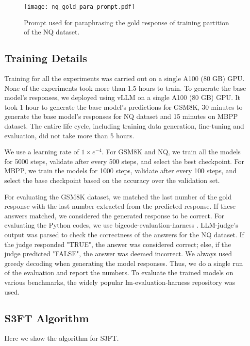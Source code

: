 \begin{figure}
    \centering
    \texttt{[image: nq\_gold\_para\_prompt.pdf]}
    \caption{Prompt used for paraphrasing the gold response of training partition of the NQ dataset.}
    \label{fig:nq_gold_para_prompt}
\end{figure}

\subsection{Training Details}
\label{app:train_detail}
Training for all the experiments was carried out on a single A100 (80 GB) GPU. None of the experiments took more than 1.5 hours to train. To generate the base model's responses, we deployed \mistral using vLLM on a single A100 (80 GB) GPU. It took 1 hour to generate the base model's predictions for GSM8K, 30 minutes to generate the base model's responses for NQ dataset and 15 minutes on MBPP dataset. The entire life cycle, including training data generation, fine-tuning and evaluation, did not take more than 5 hours.

We use a learning rate of $1 \times e^{-4}$. For GSM8K and NQ, we train all the models for 5000 steps, validate after every 500 steps, and select the best checkpoint. For MBPP, we train the models for 1000 steps, validate after every 100 steps, and select the base checkpoint based on the accuracy over the validation set.

For evaluating the GSM8K dataset, we matched the last number of the gold response with the last number extracted from the predicted response. If these answers matched, we considered the generated response to be correct. For evaluating the Python codes, we use bigcode-evaluation-harness \cite{bigcode-evaluation-harness}. LLM-judge's output was parsed to check the correctness of the answers for the NQ dataset. If the judge responded "TRUE", the answer was considered correct; else, if the judge predicted "FALSE", the answer was deemed incorrect. We always used greedy decoding when generating the model responses. Thus, we do a single run of the evaluation and report the numbers. To evaluate the trained models on various benchmarks, the widely popular lm-evaluation-harness \cite{eval-harness} repository was used.

\subsection{S3FT Algorithm}
\label{app:algo}
Here we show the algorithm for S3FT.

